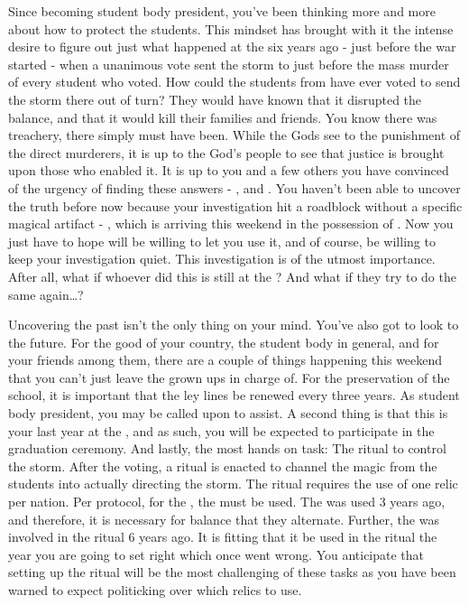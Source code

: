 \documentclass[char]{GL2020}
\begin{document}
Since becoming student body president, you’ve been thinking more and more about how to protect the students. This mindset has brought with it the intense desire to figure out just what happened at the \pSc{} six years ago - just before the war started - when a unanimous vote sent the storm to \pShip{} just before the mass murder of every student who voted. How could the students from \pShip{} have ever voted to send the storm there out of turn? They would have known that it disrupted the balance, and that it would kill their families and friends. You know there was treachery, there simply must have been. While the Gods see to the punishment of the direct murderers, it is up to the God’s people to see that justice is brought upon those who enabled it. It is up to you and a few others you have convinced of the urgency of finding these answers - \cLibAssist{}, and \cHeir{}. You haven't been able to uncover the truth before now because your investigation hit a roadblock without a specific magical artifact - \iMirror{}, which is arriving this weekend in the possession of \cDiplomat{}. Now you just have to hope \cDiplomat{\they} will be willing to let you use it, and of course, be willing to keep your investigation quiet. This investigation is of the utmost importance. After all, what if whoever did this is still at the \pSc{}? And what if they try to do the same again\dots?

Uncovering the past isn't the only thing on your mind. You've also got to look to the future. For the good of your country, the student body in general, and for your friends among them, there are a couple of things happening this weekend that you can't just leave the grown ups in charge of. For the preservation of the school, it is important that the ley lines be renewed every three years. As student body president, you may be called upon to assist. A second thing is that this is your last year at the \pSc{}, and as such, you will be expected to participate in the graduation ceremony. And lastly, the most hands on task: The ritual to control the storm. After the voting, a ritual is enacted to channel the magic from the students into actually directing the storm. The ritual requires the use of one relic per nation. Per protocol, for the \pShip{}, the \iNet{} must be used. The \iChalice{} was used 3 years ago, and therefore, it is necessary for balance that they alternate. Further, the \iNet{} was involved in the ritual 6 years ago. It is fitting that it be used in the ritual the year you are going to set right which once went wrong. You anticipate that setting up the ritual will be the most challenging of these tasks as you have been warned to expect politicking over which relics to use.
\end{document}
